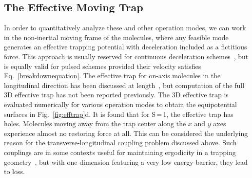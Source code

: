 \subsection{The Effective Moving Trap}
In order to quantitatively analyze these and other operation modes, we can work in the non-inertial moving frame of the molecules, where any feasible mode generates an effective trapping potential with deceleration included as a fictitious force. 
This approach is usually reserved for continuous deceleration schemes~\cite{Osterwalder2010,Narevicius2008}, but is equally valid for pulsed schemes provided their velocity satisfies Eq.~\ref{breakdownequation}. 
The effective trap for on-axis molecules in the longitudinal direction has been discussed at length~\cite{Bethlem2000,Hudson2004}, but computation of the full 3D effective trap has not been reported previously.
The 3D effective trap is evaluated numerically for various operation modes to obtain the equipotential surfaces in Fig.~\ref{fig:efftrap}d.
It is found that for S\,=\,1, the effective trap has holes. 
Molecules moving away from the trap center along the $x$ and $y$ axes experience almost no restoring force at all. 
This can be considered the underlying reason for the transverse-longitudinal coupling problem discussed above. 
Such couplings are in some contexts useful for maintaining ergodicity in a trapping geometry~\cite{Surkov1996}, but with one dimension featuring a very low energy barrier, they lead to loss.

